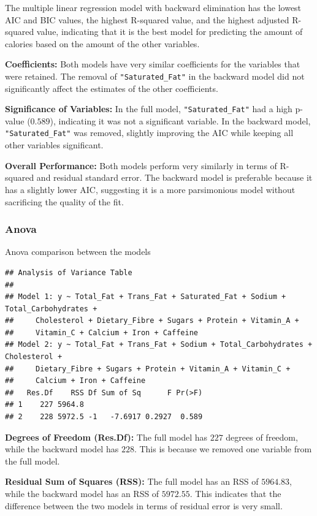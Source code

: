 \documentclass[
]{article}
\begin{document}
The multiple linear regression model with backward elimination has the
lowest AIC and BIC values, the highest R-squared value, and the highest
adjusted R-squared value, indicating that it is the best model for
predicting the amount of calories based on the amount of the other
variables.

\textbf{Coefficients:} Both models have very similar coefficients for
the variables that were retained. The removal of
\texttt{"Saturated\_Fat"} in the backward model did not significantly
affect the estimates of the other coefficients.

\textbf{Significance of Variables:} In the full model,
\texttt{"Saturated\_Fat"} had a high p-value (\(0.589\)), indicating it
was not a significant variable. In the backward model,
\texttt{"Saturated\_Fat"} was removed, slightly improving the AIC while
keeping all other variables significant.

\textbf{Overall Performance:} Both models perform very similarly in
terms of R-squared and residual standard error. The backward model is
preferable because it has a slightly lower AIC, suggesting it is a more
parsimonious model without sacrificing the quality of the fit.

\subsubsection{Anova}\label{anova}

Anova comparison between the models

\begin{verbatim}
## Analysis of Variance Table
## 
## Model 1: y ~ Total_Fat + Trans_Fat + Saturated_Fat + Sodium + Total_Carbohydrates + 
##     Cholesterol + Dietary_Fibre + Sugars + Protein + Vitamin_A + 
##     Vitamin_C + Calcium + Iron + Caffeine
## Model 2: y ~ Total_Fat + Trans_Fat + Sodium + Total_Carbohydrates + Cholesterol + 
##     Dietary_Fibre + Sugars + Protein + Vitamin_A + Vitamin_C + 
##     Calcium + Iron + Caffeine
##   Res.Df    RSS Df Sum of Sq      F Pr(>F)
## 1    227 5964.8                           
## 2    228 5972.5 -1   -7.6917 0.2927  0.589
\end{verbatim}

\textbf{Degrees of Freedom (Res.Df):} The full model has \(227\) degrees
of freedom, while the backward model has \(228\). This is because we
removed one variable from the full model.

\textbf{Residual Sum of Squares (RSS):} The full model has an RSS of
\(5964.83\), while the backward model has an RSS of \(5972.55\). This
indicates that the difference between the two models in terms of
residual error is very small.
\end{document}
